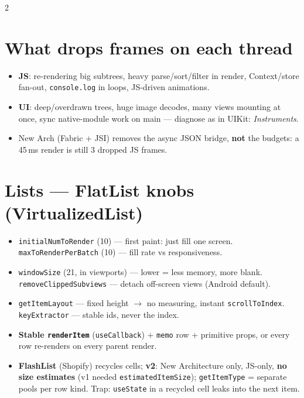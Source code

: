 \documentclass[8pt]{extarticle}
\begin{document}
\begin{multicols}{2}
\raggedright

\section{What drops frames on each thread}
\begin{itemize}
  \item \textbf{JS}: re-rendering big subtrees, heavy parse/sort/filter in render,
        Context/store fan-out, \texttt{console.log} in loops, JS-driven animations.
  \item \textbf{UI}: deep/overdrawn trees, huge image decodes, many views mounting at
        once, sync native-module work on main — diagnose as in UIKit: \emph{Instruments}.
  \item New Arch (Fabric + JSI) removes the async JSON bridge, \textbf{not} the
        budgets: a 45\,ms render is still 3 dropped JS frames.
\end{itemize}

\section{Lists — FlatList knobs (VirtualizedList)}
\begin{itemize}
  \item \texttt{initialNumToRender} (10) — first paint: just fill one screen.
        \texttt{maxToRenderPerBatch} (10) — fill rate vs responsiveness.
  \item \texttt{windowSize} (21, in viewports) — lower = less memory, more blank.
        \texttt{removeClippedSubviews} — detach off-screen views (Android default).
  \item \texttt{getItemLayout} — fixed height $\to$ no measuring, instant
        \texttt{scrollToIndex}. \texttt{keyExtractor} — stable ids, never the index.
  \item \textbf{Stable \texttt{renderItem}} (\texttt{useCallback}) + \texttt{memo} row +
        primitive props, or every row re-renders on every parent render.
  \item \textbf{FlashList} (Shopify) recycles cells; \textbf{v2}: New Architecture only,
        JS-only, \textbf{no size estimates} (v1 needed \texttt{estimatedItemSize});
        \texttt{getItemType} = separate pools per row kind. Trap: \texttt{useState}
        in a recycled cell leaks into the next item.
\end{itemize}


\end{multicols}
\end{document}
